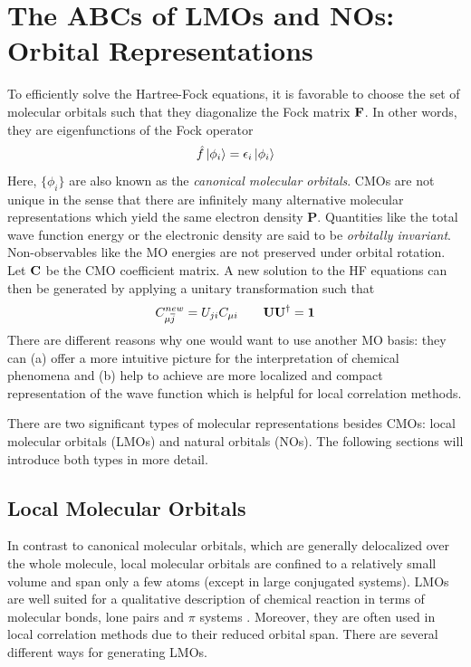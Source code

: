\section{The ABCs of LMOs and NOs: Orbital Representations \label{sec:ABCLMO}}

To efficiently solve the Hartree-Fock equations, it is favorable to choose the set of molecular orbitals such that they diagonalize the Fock matrix $\mathbf{F}$. In other words, they are eigenfunctions of the Fock operator
\begin{equation}
\hat{f}\ket{\smash{\phi_i}} = \epsilon_i \ket{\smash{\phi_i}}
\end{equation} 
\noindent Here, $\{\phi_i\}$ are also known as the \emph{canonical molecular orbitals}. CMOs are not unique in the sense that there are infinitely many alternative molecular representations which yield the same electron density $\mathbf{P}$. Quantities like the total wave function energy or the electronic density are said to be \emph{orbitally invariant}. Non-observables like the MO energies are not preserved under orbital rotation. Let $\mathbf{C}$ be the CMO coefficient matrix. A new solution to the HF equations can then be generated by applying a unitary transformation such that
\begin{equation}
C^{new}_{\mu \overline{j}} = U_{ji} C_{\mu i} \qquad \mathbf{UU}^{\dagger} = \mathbf{1}
\end{equation} 
\noindent There are different reasons why one would want to use another MO basis: they can (a) offer a more intuitive picture for the interpretation of chemical phenomena and (b) help to achieve are more localized and compact representation of the wave function which is helpful for local correlation methods.

There are two significant types of molecular representations besides CMOs: local molecular orbitals (LMOs) and natural orbitals (NOs). The following sections will introduce both  types in more detail.

\subsection{Local Molecular Orbitals}

In contrast to canonical molecular orbitals, which are generally delocalized over the whole molecule, local molecular orbitals are confined to a relatively small volume and span only a few atoms (except in large conjugated systems). LMOs are well suited for a qualitative description of chemical reaction in terms of molecular bonds, lone pairs and $\pi$ systems \cite{Ste2019}. Moreover, they are often used in local correlation methods due to their reduced orbital span. There are several different ways for generating LMOs.

